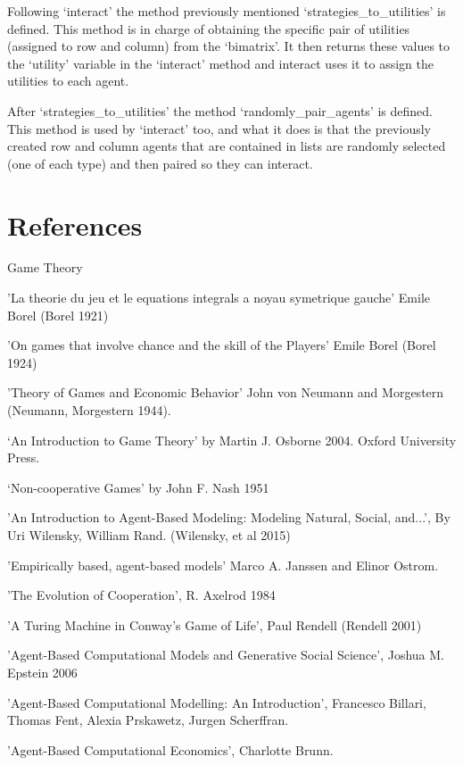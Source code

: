 \documentclass{article}
\begin{document}
Following ‘interact’ the method previously mentioned ‘strategies\_to\_utilities’ is defined. This method is in charge of obtaining the specific pair of utilities (assigned to row and column) from the ‘bimatrix’. It then returns these values to the ‘utility’ variable in the ‘interact’ method and interact uses it to assign the utilities to each agent.

After ‘strategies\_to\_utilities’ the method ‘randomly\_pair\_agents’ is defined. This method is used by ‘interact’ too, and what it does is that the previously created row and column agents that are contained in lists are randomly selected (one of each type) and then paired so they can interact.


\section{References}


Game Theory

'La theorie du jeu et le equations integrals a noyau symetrique gauche' Emile Borel (Borel 1921)

'On games that involve chance and the skill of the Players' Emile Borel (Borel 1924)

'Theory of Games and Economic Behavior' John von Neumann and Morgestern (Neumann, Morgestern 1944).

‘An Introduction to Game Theory’ by Martin J. Osborne 2004. Oxford University Press.

‘Non-cooperative Games' by John F. Nash 1951

'An Introduction to Agent-Based Modeling: Modeling Natural, Social, and...', By Uri Wilensky, William Rand. (Wilensky, et al 2015)

'Empirically based, agent-based models' Marco A. Janssen and Elinor Ostrom.

'The Evolution of Cooperation', R. Axelrod 1984

'A Turing Machine in Conway’s Game of Life', Paul Rendell (Rendell 2001)

'Agent-Based Computational Models and Generative Social Science', Joshua M. Epstein 2006

'Agent-Based Computational Modelling: An Introduction', Francesco Billari, Thomas Fent, Alexia Prskawetz, Jurgen Scherffran.

'Agent-Based Computational Economics', Charlotte Brunn.
\end{document}
